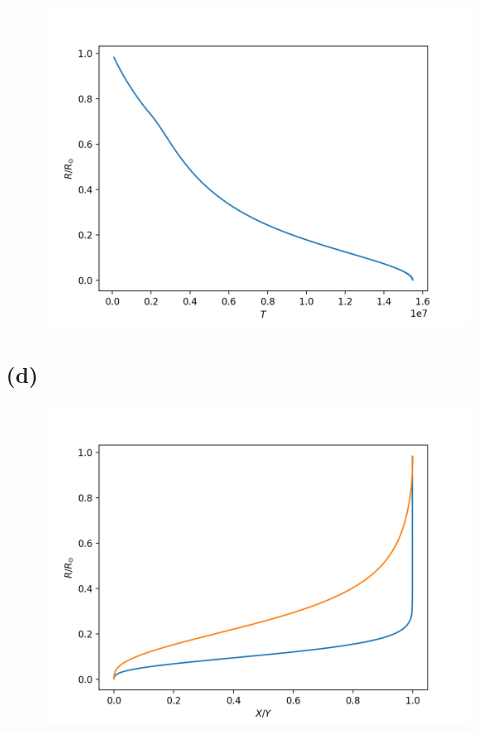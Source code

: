 \documentclass[11pt]{article}
\begin{document}
\begin{figure}[h!]
    \centering
    {{\includegraphics[width=15cm]{Figure_2.png} }}%
    \caption{}%
    \label{fig:example}%
\end{figure}

\newpage

\subsection*{(d)}

\begin{figure}[h!]
    \centering
    {{\includegraphics[width=15cm]{Figure_3.png} }}%
    \caption{}
    \label{fig:example}%
\end{figure}
\end{document}
